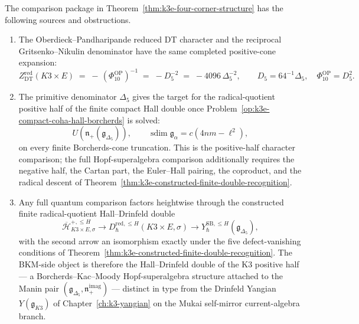 \begin{proposition}
\label{prop:k3e-four-corner-comparison-maps}
The comparison package in Theorem~\ref{thm:k3e-four-corner-structure}
has the following sources and obstructions.
\begin{enumerate}[label=\textup{(\roman*)}]
\item The Oberdieck--Pandharipande reduced DT character and the
reciprocal Gritsenko--Nikulin denominator have the same completed
positive-cone expansion:
\[
 Z^{\mathrm{red}}_{\mathrm{DT}}(K3\times E)
 \;=\;
 -\,(\Phi_{10}^{\mathrm{OP}})^{-1}
 \;=\;
 -D_5^{-2}
 \;=\;
 -4096\,\Delta_5^{-2},
 \qquad
 D_5=64^{-1}\Delta_5,\quad \Phi_{10}^{\mathrm{OP}}=D_5^2.
\]
\item The primitive denominator $\Delta_5$ gives the target for the
radical-quotient positive half of the finite compact Hall double once
Problem~\ref{op:k3e-compact-coha-hall-borcherds} is solved:
\[
 U(\mathfrak n_+(\mathfrak g_{\Delta_5})),
 \qquad
 \operatorname{sdim}\mathfrak g_\alpha=c(4nm-\ell^2),
\]
on every finite Borcherds-cone truncation. This is the positive-half
character comparison; the full Hopf-superalgebra comparison
additionally requires the negative half, the Cartan part, the
Euler--Hall pairing, the coproduct, and the radical descent of
Theorem~\ref{thm:k3e-constructed-finite-double-recognition}.
\item Any full quantum comparison factors heightwise through the
constructed finite radical-quotient Hall--Drinfeld double
\[
 \overline{\mathcal H}^{+,\leq H}_{K3\times E,\sigma}
 \longrightarrow
 D^{\mathrm{red},\leq H}_{\hbar}(K3\times E,\sigma)
 \longrightarrow
 Y^{\mathrm{SB},\leq H}_{\hbar}(\mathfrak g_{\Delta_5}),
\]
with the second arrow an isomorphism exactly under the five
defect-vanishing conditions of
Theorem~\ref{thm:k3e-constructed-finite-double-recognition}. The
BKM-side object is therefore the Hall--Drinfeld double of the K3
positive half — a Borcherds--Kac--Moody Hopf-superalgebra structure
attached to the Manin pair
$(\mathfrak{g}_{\Delta_5}, \mathfrak{n}_+^{\mathrm{imag}})$ — distinct
in type from the Drinfeld Yangian $Y(\mathfrak{g}_{K3})$ of
Chapter~\ref{ch:k3-yangian} on the Mukai self-mirror
current-algebra branch.
\end{enumerate}
\end{proposition}

